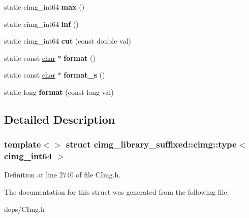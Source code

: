 \begin{DoxyCompactItemize}
static cimg\+\_\+int64 {\bfseries max} ()
\item 
\mbox{\label{structcimg__library__suffixed_1_1cimg_1_1type_3_01cimg__int64_01_4_a157ff55cb3154bfebec2250d24409e07}} 
static cimg\+\_\+int64 {\bfseries inf} ()
\item 
\mbox{\label{structcimg__library__suffixed_1_1cimg_1_1type_3_01cimg__int64_01_4_ae772107b570b978c588ef92f4b6a19f6}} 
static cimg\+\_\+int64 {\bfseries cut} (const double val)
\item 
\mbox{\label{structcimg__library__suffixed_1_1cimg_1_1type_3_01cimg__int64_01_4_a22b9cc8b4e21634edec5e6dbced6e264}} 
static const \hyperlink{classchar}{char} $\ast$ {\bfseries format} ()
\item 
\mbox{\label{structcimg__library__suffixed_1_1cimg_1_1type_3_01cimg__int64_01_4_a34856849bced81bd7f9b713b53fbcadf}} 
static const \hyperlink{classchar}{char} $\ast$ {\bfseries format\+\_\+s} ()
\item 
\mbox{\label{structcimg__library__suffixed_1_1cimg_1_1type_3_01cimg__int64_01_4_a69a53ad1ce187fd2750d5e4ac4e7578d}} 
static long {\bfseries format} (const long val)
\end{DoxyCompactItemize}


\subsection{Detailed Description}
\subsubsection*{template$<$$>$\newline
struct cimg\+\_\+library\+\_\+suffixed\+::cimg\+::type$<$ cimg\+\_\+int64 $>$}



Definition at line 2740 of file C\+Img.\+h.



The documentation for this struct was generated from the following file\+:\begin{DoxyCompactItemize}
\item 
deps/C\+Img.\+h\end{DoxyCompactItemize}
